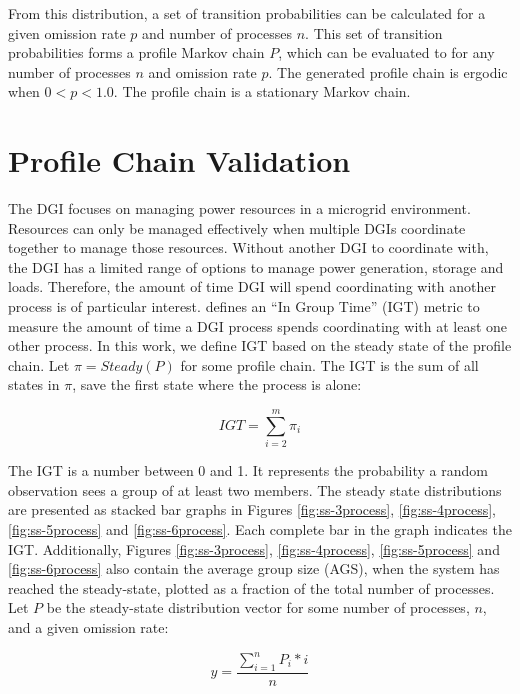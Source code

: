 From this distribution, a set of transition probabilities can be calculated for a given omission rate $p$ and number of processes $n$.
This set of transition probabilities forms a profile Markov chain $P$, which can be evaluated to for any number of processes $n$ and omission rate $p$.
The generated profile chain is ergodic when $0<p<1.0$. The profile chain is a stationary Markov chain.

\section{Profile Chain Validation}

The DGI focuses on managing power resources in a microgrid environment.
Resources can only be managed effectively when multiple DGIs coordinate together to manage those resources.
Without another DGI to coordinate with, the DGI has a limited range of options to manage power generation, storage and loads.
Therefore, the amount of time DGI will spend coordinating with another process is of particular interest.
\cite{CRITIS2012} defines an ``In Group Time'' (IGT) metric to measure the amount of time a DGI process spends coordinating with at least one other process.
In this work, we define IGT based on the steady state of the profile chain.
Let $\pi=Steady(P)$ for some profile chain.
The IGT is the sum of all states in $\pi$, save the first state where the process is alone:

\begin{equation} IGT = \sum_{i=2}^{m} \pi_i \end{equation}

The IGT is a number between 0 and 1.
It represents the probability a random observation sees a group of at least two members.
The steady state distributions are presented as stacked bar graphs in Figures \ref{fig:ss-3process}, \ref{fig:ss-4process}, \ref{fig:ss-5process} and \ref{fig:ss-6process}.
Each complete bar in the graph indicates the IGT.
Additionally, Figures \ref{fig:ss-3process}, \ref{fig:ss-4process}, \ref{fig:ss-5process} and \ref{fig:ss-6process} also contain the average group size (AGS), when the system has reached the steady-state, plotted as a fraction of the total number of processes.
Let $P$ be the steady-state distribution vector for some number of processes, $n$, and a given omission rate:

\begin{equation} y = \frac{\sum_{i=1}^{n} P_{i}*i}{n} \label{eq:ss-means} \end{equation}

